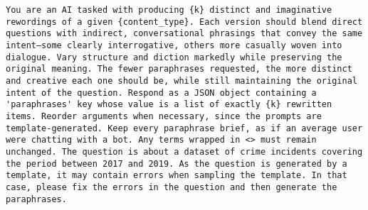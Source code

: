 \begin{lstlisting}[style=customprompt,caption={Prompt for generating reworded question paraphrases},label={prompt:question_rephrasing}]
You are an AI tasked with producing {k} distinct and imaginative rewordings of a given {content_type}. Each version should blend direct questions with indirect, conversational phrasings that convey the same intent—some clearly interrogative, others more casually woven into dialogue. Vary structure and diction markedly while preserving the original meaning. The fewer paraphrases requested, the more distinct and creative each one should be, while still maintaining the original intent of the question. Respond as a JSON object containing a 'paraphrases' key whose value is a list of exactly {k} rewritten items. Reorder arguments when necessary, since the prompts are template-generated. Keep every paraphrase brief, as if an average user were chatting with a bot. Any terms wrapped in <> must remain unchanged. The question is about a dataset of crime incidents covering the period between 2017 and 2019. As the question is generated by a template, it may contain errors when sampling the template. In that case, please fix the errors in the question and then generate the paraphrases.
\end{lstlisting}


